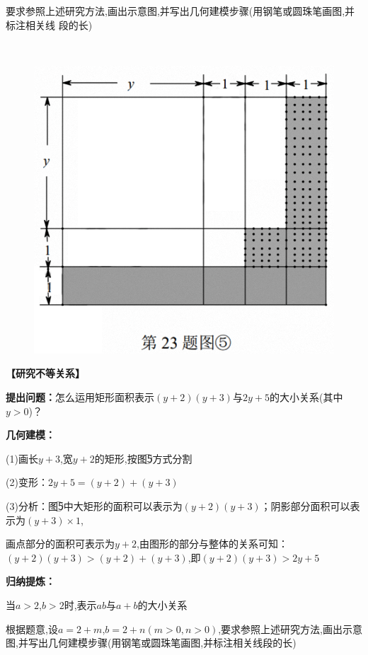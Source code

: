 \documentclass[10pt,a4paper]{ctexart}
\begin{document}
	要求参照上述研究方法,画出示意图,并写出几何建模步骤(用钢笔或圆珠笔画图,并标注相关线
	段的长)
	
	\rule{0em}{10em}\\
	
	\begin{figure}
		\includegraphics[width=\linewidth]{23/2013d}
	\end{figure}
	
	\textbf{【研究不等关系】}
	
	\textbf{提出问题：}怎么运用矩形面积表示$ (y+2)(y+3)与2y+5 $的大小关系(其中$ y>0 $)？
	
	\textbf{几何建模：}
	
	(1)画长$ y+3 $,宽$ y+2 $的矩形,按图\textcircled{5}方式分割
	
	(2)变形：$ 2y+5=(y+2)+(y+3) $
	
	(3)分析：图\textcircled{5}中大矩形的面积可以表示为$ (y+2)(y+3) $；阴影部分面积可以表示为$ (y+3)\times 1 $,
	
	画点部分的面积可表示为$ y+2 $,由图形的部分与整体的关系可知：$ (y+2)(y+3)>(y+2)+(y+3) $,即$ (y+2)(y+3)>2y+5 $
	
	\textbf{归纳提炼：}
	
	当$ a>2  $,$ b>2 $时,表示$ ab $与$ a+b $的大小关系
	
	根据题意,设$ a=2+m $,$ b=2+n(m>0,n>0) $,要求参照上述研究方法,画出示意图,并写出几何建模步骤(用钢笔或圆珠笔画图,并标注相关线段的长)
	
\end{document}
